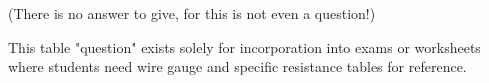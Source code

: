 





(There is no answer to give, for this is not even a question!)







This table "question" exists solely for incorporation into exams or worksheets where students need wire gauge and specific resistance tables for reference.




